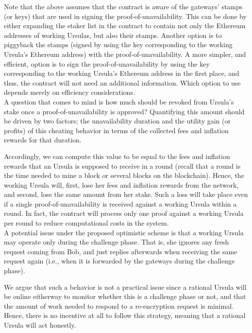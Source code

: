 Note that the above assumes that the \stakeescrow contract is aware of the gateways' stamps (or keys) that are used in signing the proof-of-unavailability. This can be done by either expanding the staker list in the contract to contain not only the Ethereum addresses of working Ursulas, but also their stamps. Another option is to piggyback the stamps (signed by using the key corresponding to the working Ursula's Ethereum address) with the proof-of-unavailability. A more simpler, and efficient, option is to sign the proof-of-unavailability by using the key corresponding to the working Ursula's Ethereum address in the first place, and thus, the \stakeescrow contract will not need an additional information. Which option to use depends merely on efficiency considerations. \\


A question that comes to mind is how much should be revoked from Ursula's stake once a proof-of-unavailability is approved? Quantifying this amount should be driven by two factors; the unavailability duration and the utility gain (or profits) of this cheating behavior in terms of the collected fees and inflation rewards for that duration.


Accordingly, we can compute this value to be equal to the fees and inflation rewards that an Ursula is supposed to receive in a round (recall that a round is the time needed to mine a block or several blocks on the blockchain). Hence, the working Ursula will, first, lose her fees and inflation rewards from the network, and second, lose the same amount from her stake. Such a loss will take place even if a single proof-of-unavailability is received against a working Ursula within a round. In fact, the \stakeescrow contract will process only one proof against a working Ursula per round to reduce computational costs in the system. \\


A potential issue under the proposed optimistic scheme is that a working Ursula may operate only during the challenge phase. That is, she ignores any fresh request coming from Bob, and just replies afterwards when receiving the same request again (i.e., when it is forwarded by the gateways during the challenge phase). 


We argue that such a behavior is not a practical issue since a rational Ursula will be online eitherway to monitor whether this is a challenge phase or not, and that the amount of work needed to respond to a re-encryption request is minimal. Hence, there is no incentive at all to follow this strategy, meaning that a rational Ursula will act honestly. \\


